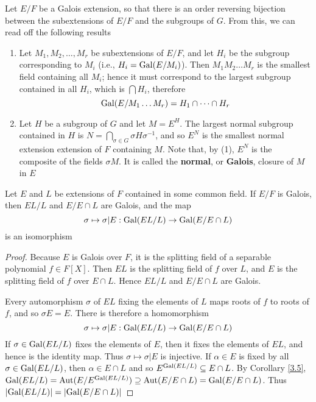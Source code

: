 \documentclass[11pt]{article}
\begin{document}
\begin{remark}
Let \(E/F\) be a Galois extension, so that there is an order reversing bijection between the
subextensions of \(E/F\) and the subgroups of \(G\). From this, we can read off the following
results
\begin{enumerate}
\item Let \(M_1,M_2,\dots,M_r\) be subextensions of \(E/F\), and let \(H_i\) be the subgroup corresponding
to \(M_i\) (i.e., \(H_i=\operatorname{Gal}(E/M_i)\)). Then \(M_1M_2\dots M_r\) is the smallest field containing
all \(M_i\); hence it must correspond to the largest subgroup contained in all \(H_i\), which
is \(\bigcap H_i\), therefore
\begin{equation*}
\operatorname{Gal}(E/M_1\dots M_r)=H_1\cap\dots\cap H_r
\end{equation*}
\item Let \(H\) be a subgroup of \(G\) and let \(M=E^H\). The largest normal subgroup contained
in \(H\) is \(N=\bigcap_{\sigma\in G}\sigma H\sigma^{-1}\), and so \(E^N\) is the smallest normal extension extension
of \(F\) containing \(M\). Note that, by (1), \(E^N\) is the composite of the fields \(\sigma M\).
It is called the \textbf{normal}, or \textbf{Galois}, closure of \(M\) in \(E\)
\end{enumerate}
\end{remark}


\begin{proposition}[]
\label{3.18}
Let \(E\) and \(L\) be extensions of \(F\) contained in some common field. If \(E/F\) is Galois,
then \(EL/L\) and \(E/E\cap L\) are Galois, and the map
\begin{equation*}
\sigma\mapsto\sigma|E:\operatorname{Gal}(EL/L)\to\operatorname{Gal}(E/E\cap L)
\end{equation*}
is an isomorphism
\end{proposition}

\begin{proof}
Because \(E\) is Galois over \(F\), it is the splitting field of a separable
polynomial \(f\in F[X]\). Then \(EL\) is the splitting field of \(f\) over \(L\), and \(E\) is the
splitting field of \(f\) over \(E\cap L\). Hence \(EL/L\) and \(E/E\cap L\) are Galois.

Every automorphism \(\sigma\) of \(EL\) fixing the elements of \(L\) maps roots of \(f\) to roots
of \(f\), and so \(\sigma E=E\). There is therefore a homomorphism
\begin{equation*}
\sigma\mapsto\sigma|E:\operatorname{Gal}(EL/L)\to\operatorname{Gal}(E/E\cap L)
\end{equation*}
If \(\sigma\in\operatorname{Gal}(EL/L)\) fixes the elements of \(E\), then it fixes the elements of \(EL\), and hence
is the identity map. Thus \(\sigma\mapsto\sigma|E\) is injective. If \(\alpha\in E\) is fixed by all \(\sigma\in\operatorname{Gal}(EL/L)\),
then \(\alpha\in E\cap L\) and so \(E^{\operatorname{Gal}(EL/L)}\subseteq E\cap L\). By Corollary
\ref{3.5}, \(\operatorname{Gal}(EL/L)=\operatorname{\text{Aut}}(E/E^{\operatorname{Gal}(EL/L)})\supseteq\operatorname{\text{Aut}}(E/E\cap L)=\operatorname{Gal}(E/E\cap L)\).
Thus \(\abs{\Gal(EL/L)}=\abs{\Gal(E/E\cap L)}\)
\end{proof}
\end{document}
